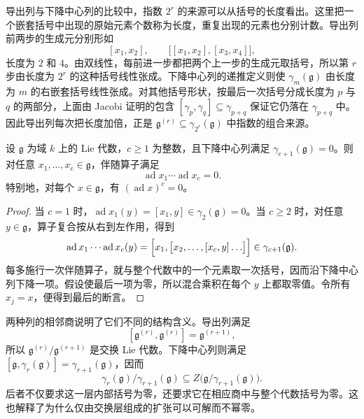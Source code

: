 导出列与下降中心列的比较中，指数 \(2^r\) 的来源可以从括号的长度看出。这里把一个嵌套括号中出现的原始元素个数称为长度，重复出现的元素也分别计数。导出列前两步的生成元分别形如
\[
	[x_1,x_2],\qquad \bigl[[x_1,x_2],[x_3,x_4]\bigr],
\]
长度为 \(2\) 和 \(4\)。由双线性，每前进一步都把两个上一步的生成元取括号，所以第 \(r\) 步由长度为 \(2^r\) 的这种括号线性张成。下降中心列的递推定义则使 \(\gamma_m(\mathfrak g)\) 由长度为 \(m\) 的右嵌套括号线性张成。对其他括号形状，按最后一次括号分成长度为 \(p\) 与 \(q\) 的两部分，上面由 Jacobi 证明的包含 \([\gamma_p,\gamma_q]\subseteq\gamma_{p+q}\) 保证它仍落在 \(\gamma_{p+q}\) 中。因此导出列每次把长度加倍，正是 \(\mathfrak g^{(r)}\subseteq\gamma_{2^r}(\mathfrak g)\) 中指数的组合来源。

\begin{corollary}\label{b5:cor:nilpotent-adjoint-operators}
	设 \(\mathfrak g\) 为域 \(k\) 上的 Lie 代数，\(c\geq1\) 为整数，且下降中心列满足 \(\gamma_{c+1}(\mathfrak g)=0\)。则对任意 \(x_1,\ldots,x_c\in\mathfrak g\)，伴随算子满足
	\[
		\operatorname{ad}x_1\cdots\operatorname{ad}x_c=0.
	\]
	特别地，对每个 \(x\in\mathfrak g\)，有 \((\operatorname{ad}x)^c=0\)。
\end{corollary}
\begin{proof}
	当 \(c=1\) 时，\(\operatorname{ad}x_1(y)=[x_1,y]\in\gamma_2(\mathfrak g)=0\)。当 \(c\geq2\) 时，对任意 \(y\in\mathfrak g\)，算子复合按从右到左作用，得到
	\[
		\operatorname{ad}x_1\cdots\operatorname{ad}x_c(y) =\Bigl[x_1,\bigl[x_2,\ldots,[x_c,y]\ldots\bigr]\Bigr] \in\gamma_{c+1}(\mathfrak g).
	\]
	每多施行一次伴随算子，就与整个代数中的一个元素取一次括号，因而沿下降中心列下降一项。假设使最后一项为零，所以混合乘积在每个 \(y\) 上都取零值。令所有 \(x_j=x\)，便得到最后的断言。
\end{proof}
两种列的相邻商说明了它们不同的结构含义。导出列满足
\[
	[\mathfrak g^{(r)},\mathfrak g^{(r)}] =\mathfrak g^{(r+1)},
\]
所以 \(\mathfrak g^{(r)}/\mathfrak g^{(r+1)}\) 是交换 Lie 代数。下降中心列则满足 \([\mathfrak g,\gamma_r(\mathfrak g)]=\gamma_{r+1}(\mathfrak g)\)，因而
\[
	\gamma_r(\mathfrak g)/\gamma_{r+1}(\mathfrak g) \subseteq Z\bigl(\mathfrak g/\gamma_{r+1}(\mathfrak g)\bigr).
\]
后者不仅要求这一层内部括号为零，还要求它在相应商中与整个代数括号为零。这也解释了为什么仅由交换层组成的扩张可以可解而不幂零。

